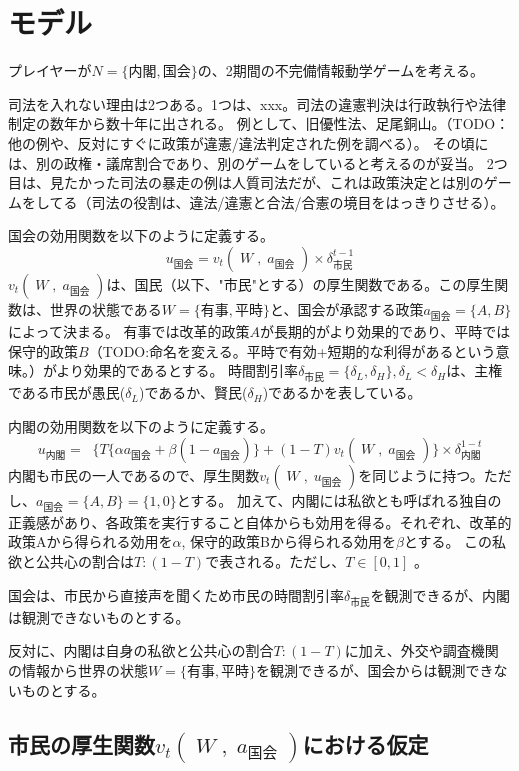 \documentclass[uplatex,a4j,11pt]{jsarticle}
\renewcommand{\footnote}{\endnote}     %
\theoremstyle{roman}
\begin{document}
\section{モデル}

プレイヤーが$N=\lbrace 内閣, 国会 \rbrace$の、2期間の不完備情報動学ゲームを考える。



司法を入れない理由は2つある。1つは、xxx。司法の違憲判決は行政執行や法律制定の数年から数十年に出される。
例として、旧優性法、足尾銅山。（TODO：他の例や、反対にすぐに政策が違憲/違法判定された例を調べる）。
その頃には、別の政権・議席割合であり、別のゲームをしていると考えるのが妥当。
2つ目は、見たかった司法の暴走の例は人質司法だが、これは政策決定とは別のゲームをしてる（司法の役割は、違法/違憲と合法/合憲の境目をはっきりさせる）。


国会の効用関数を以下のように定義する。
$$u_\text{国会} = v_t(\;W\;,\; a_\text{国会}\;) × \delta^{t-1}_\text{市民}$$
$v_t(\;W\;,\; a_\text{国会}\;)$は、国民（以下、"市民"とする）の厚生関数である。この厚生関数は、世界の状態である$W=\lbrace 有事, 平時\rbrace$と、国会が承認する政策$a_{国会}=\lbrace A, B\rbrace$によって決まる。
有事では改革的政策$A$が長期的がより効果的であり、平時では保守的政策$B$（TODO:命名を変える。平時で有効+短期的な利得があるという意味。）がより効果的であるとする。
時間割引率$\delta_{市民}=\lbrace \delta_L, \delta_H \rbrace, \delta_L<\delta_H$は、主権である市民が愚民($\delta_L$)であるか、賢民($\delta_H$)であるかを表している。

内閣の効用関数を以下のように定義する。
$$ u_\text{内閣} =\;\; \lbrace T\lbrace \alpha a_\text{国会} + \beta (1-a_\text{国会}) \rbrace  + (1-T)v_t(\;W\;,\; a_\text{国会}\;) \rbrace × \delta^{1-t}_{内閣}$$
内閣も市民の一人であるので、厚生関数$v_t(\;W\;,\; u_\text{国会}\;)$を同じように持つ。ただし、$a_{国会}=\lbrace A, B\rbrace = \lbrace 1,0\rbrace$とする。
加えて、内閣には私欲とも呼ばれる独自の正義感があり、各政策を実行すること自体からも効用を得る。それぞれ、改革的政策Aから得られる効用を$\alpha$, 保守的政策Bから得られる効用を$\beta$とする。
この私欲と公共心の割合は$T:(1-T)$で表される。ただし、$T\in[0,1]$ 。

国会は、市民から直接声を聞くため市民の時間割引率$\delta_{市民}$を観測できるが、内閣は観測できないものとする。

反対に、内閣は自身の私欲と公共心の割合$T:(1-T)$に加え、外交や調査機関の情報\footnote{これらはモデル外の話。}から世界の状態$W=\lbrace 有事, 平時\rbrace$を観測できるが、国会からは観測できないものとする。


\subsection*{市民の厚生関数$v_t(\;W\;,\; a_\text{国会}\;)$における仮定}
\end{document}
